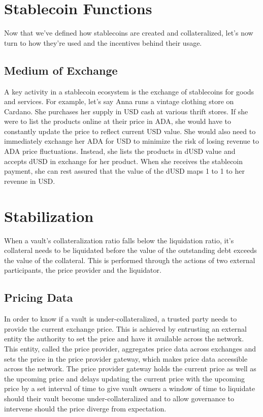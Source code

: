 \documentclass[12pt]{article}
\begin{document}
\section{Stablecoin Functions}

Now that we've defined how stablecoins are created and collateralized, let's now turn to how they're used and the incentives behind their usage.

\subsection{Medium of Exchange}

A key activity in a stablecoin ecosystem is the exchange of stablecoins for goods and services. For example, let's say Anna runs a vintage clothing store on Cardano. She purchases her supply in USD cash at various thrift stores. If she were to list the products online at their price in ADA, she would have to constantly update the price to reflect current USD value. She would also need to immediately exchange her ADA for USD to minimize the risk of losing revenue to ADA price fluctuations. Instead, she lists the products in dUSD value and accepts dUSD in exchange for her product. When she receives the stablecoin payment, she can rest assured that the value of the dUSD maps 1 to 1 to her revenue in USD.

\section{Stabilization}
When a vault's collateralization ratio falls below the liquidation ratio, it's collateral needs to be liquidated before the value of the outstanding debt exceeds the value of the collateral. This is performed through the actions of two external participants, the price provider and the liquidator.

\subsection{Pricing Data}
In order to know if a vault is under-collateralized, a trusted party needs to provide the current exchange price. This is achieved by entrusting an external entity the authority to set the price and have it available across the network. This entity, called the price provider, aggregates price data across exchanges and sets the price in the price provider gateway, which makes price data accessible across the network. The price provider gateway holds the current price as well as the upcoming price and delays updating the current price with the upcoming price by a set interval of time to give vault owners a window of time to liquidate should their vault become under-collateralized and to allow governance to intervene should the price diverge from expectation.
\end{document}
